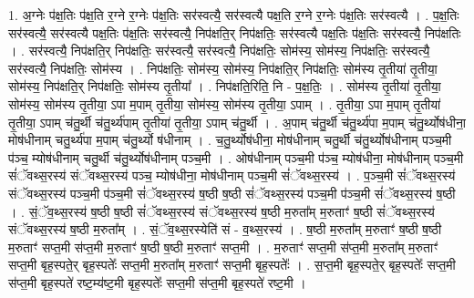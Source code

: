 \documentclass[17pt]{extarticle}
\begin{document}
1. अ॒ग्नेः प॑क्ष॒तिः प॑क्ष॒ति र॒ग्ने र॒ग्नेः प॑क्ष॒तिः सर॑स्वत्यै॒ सर॑स्वत्यै पक्ष॒ति र॒ग्ने र॒ग्नेः प॑क्ष॒तिः सर॑स्वत्यै । . प॒क्ष॒तिः सर॑स्वत्यै॒ सर॑स्वत्यै पक्ष॒तिः प॑क्ष॒तिः सर॑स्वत्यै॒ निप॑क्षति॒र् निप॑क्षतिः॒ सर॑स्वत्यै पक्ष॒तिः प॑क्ष॒तिः सर॑स्वत्यै॒ निप॑क्षतिः । . सर॑स्वत्यै॒ निप॑क्षति॒र् निप॑क्षतिः॒ सर॑स्वत्यै॒ सर॑स्वत्यै॒ निप॑क्षतिः॒ सोम॑स्य॒ सोम॑स्य॒ निप॑क्षतिः॒ सर॑स्वत्यै॒ सर॑स्वत्यै॒ निप॑क्षतिः॒ सोम॑स्य । . निप॑क्षतिः॒ सोम॑स्य॒ सोम॑स्य॒ निप॑क्षति॒र् निप॑क्षतिः॒ सोम॑स्य तृ॒तीया॑ तृ॒तीया॒ सोम॑स्य॒ निप॑क्षति॒र् निप॑क्षतिः॒ सोम॑स्य तृ॒तीया᳚ । . निप॑क्षति॒रिति॒ नि - प॒क्ष॒तिः॒ । . सोम॑स्य तृ॒तीया॑ तृ॒तीया॒ सोम॑स्य॒ सोम॑स्य तृ॒तीया॒ ऽपा म॒पाम् तृ॒तीया॒ सोम॑स्य॒ सोम॑स्य तृ॒तीया॒ ऽपाम् । . तृ॒तीया॒ ऽपा म॒पाम् तृ॒तीया॑ तृ॒तीया॒ ऽपाम् च॑तु॒र्थी च॑तु॒र्थ्य॑पाम् तृ॒तीया॑ तृ॒तीया॒ ऽपाम् च॑तु॒र्थी । . अ॒पाम् च॑तु॒र्थी च॑तु॒र्थ्य॑पा म॒पाम् च॑तु॒र्थ्योष॑धीना॒ मोष॑धीनाम् चतु॒र्थ्य॑पा म॒पाम् च॑तु॒र्थ्यो ष॑धीनाम् । . च॒तु॒र्थ्योष॑धीना॒ मोष॑धीनाम् चतु॒र्थी च॑तु॒र्थ्योष॑धीनाम् पञ्च॒मी प॑ञ्च॒ म्योष॑धीनाम् चतु॒र्थी च॑तु॒र्थ्योष॑धीनाम् पञ्च॒मी । . ओष॑धीनाम् पञ्च॒मी प॑ञ्च॒ म्योष॑धीना॒ मोष॑धीनाम् पञ्च॒मी सं॑ॅवथ्स॒रस्य॑ संॅवथ्स॒रस्य॑ पञ्च॒ म्योष॑धीना॒ मोष॑धीनाम् पञ्च॒मी सं॑ॅवथ्स॒रस्य॑ । . प॒ञ्च॒मी सं॑ॅवथ्स॒रस्य॑ संॅवथ्स॒रस्य॑ पञ्च॒मी प॑ञ्च॒मी सं॑ॅवथ्स॒रस्य॑ ष॒ष्ठी ष॒ष्ठी सं॑ॅवथ्स॒रस्य॑ पञ्च॒मी प॑ञ्च॒मी सं॑ॅवथ्स॒रस्य॑ ष॒ष्ठी । . सं॒ॅव॒थ्स॒रस्य॑ ष॒ष्ठी ष॒ष्ठी सं॑ॅवथ्स॒रस्य॑ संॅवथ्स॒रस्य॑ ष॒ष्ठी म॒रुता᳚म् म॒रुताꣳ॑ ष॒ष्ठी सं॑ॅवथ्स॒रस्य॑ संॅवथ्स॒रस्य॑ ष॒ष्ठी म॒रुता᳚म् । . सं॒ॅव॒थ्स॒रस्येति॑ सं - व॒थ्स॒रस्य॑ । . ष॒ष्ठी म॒रुता᳚म् म॒रुताꣳ॑ ष॒ष्ठी ष॒ष्ठी म॒रुताꣳ॑ सप्त॒मी स॑प्त॒मी म॒रुताꣳ॑ ष॒ष्ठी ष॒ष्ठी म॒रुताꣳ॑ सप्त॒मी । . म॒रुताꣳ॑ सप्त॒मी स॑प्त॒मी म॒रुता᳚म् म॒रुताꣳ॑ सप्त॒मी बृह॒स्पते॒र् बृह॒स्पतेः᳚ सप्त॒मी म॒रुता᳚म् म॒रुताꣳ॑ सप्त॒मी बृह॒स्पतेः᳚ । . स॒प्त॒मी बृह॒स्पते॒र् बृह॒स्पतेः᳚ सप्त॒मी स॑प्त॒मी बृह॒स्पते॑ रष्ट॒म्य॑ष्ट॒मी बृह॒स्पतेः᳚ सप्त॒मी स॑प्त॒मी बृह॒स्पते॑ रष्ट॒मी । \newline
\end{document}
